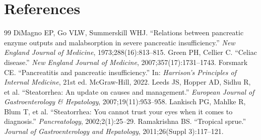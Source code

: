 \section*{References}
\begin{thebibliography}{99}
 DiMagno EP, Go VLW, Summerskill WHJ. ``Relations between pancreatic enzyme outputs and malabsorption in severe pancreatic insufficiency.'' \textit{New England Journal of Medicine}, 1973;288(16):813--815.
 Green PH, Cellier C. ``Celiac disease.'' \textit{New England Journal of Medicine}, 2007;357(17):1731--1743.
 Forsmark CE. ``Pancreatitis and pancreatic insufficiency.'' In: \textit{Harrison's Principles of Internal Medicine}, 21st ed. McGraw-Hill, 2022.
 Leeds JS, Hopper AD, Sidhu R, et al. ``Steatorrhea: An update on causes and management.'' \textit{European Journal of Gastroenterology \& Hepatology}, 2007;19(11):953--958.
 Lankisch PG, Mahlke R, Blum T, et al. ``Steatorrhea: You cannot trust your eyes when it comes to diagnosis.'' \textit{Pancreatology}, 2002;2(1):25--29.
 Ramakrishna BS. ``Tropical sprue.'' \textit{Journal of Gastroenterology and Hepatology}, 2011;26(Suppl 3):117--121.
\end{thebibliography}
